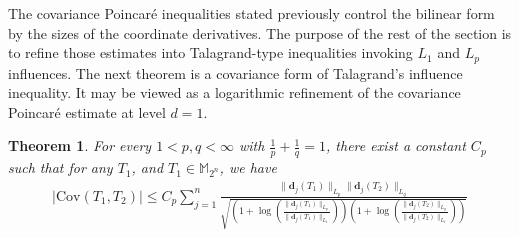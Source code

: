 \documentclass{amsbook}
\newtheorem{theorem}{Theorem}[chapter]
\theoremstyle{definition}
\theoremstyle{remark}
\numberwithin{section}{chapter}
\numberwithin{equation}{chapter}
\newcommand{\M}{\mathbb{M}}
\newcommand{\1}{\mathbf{1}}
\newcommand{\dc}{\mathbf{d}}
\begin{document}
The covariance Poincar\'e inequalities stated previously control the
bilinear form by the sizes of the coordinate derivatives.  The purpose of the rest of the section is to refine those estimates into Talagrand-type inequalities invoking $L_{1}$ and $L_{p}$ influences. The next theorem is a covariance form of Talagrand's influence inequality.  It
may be viewed as a logarithmic refinement of the covariance Poincar\'e
estimate at level $d=1$.

\begin{theorem}\label{cov-taragrand-pq}
For every $1<p,q<\infty$ with $\frac{1}{p}+\frac{1}{q}=1$, there exist a constant $C_p$ such that for any $T_{1}$,  and $T_{1}\in \M_{2^{n}}$, we have
\begin{equation}\label{cov-talagrand-pq-estimate}
\begin{split}
\big|\mathrm{Cov}(T_{1},T_{2})\big|\leq C_{p}\sum_{j=1}^{n}\frac{\|\dc_{j}(T_{1})\|_{L_{p}}\|\dc_{j}(T_{2})\|_{L_{q}}}{\sqrt{\left(1+\log\left(\frac{\|\dc_{j}(T_{1})\|_{L_{p}}}
                                  {\|\dc_{j}(T_{1})\|_{L_{1}}}\right)\right)
       \left(1+\log\left(\frac{\|\dc_{j}(T_{2})\|_{L_{q}}}
                                  {\|\dc_{j}(T_{2})\|_{L_{1}}}\right)\right)}}
\end{split}
\end{equation}
\end{theorem}
\end{document}
